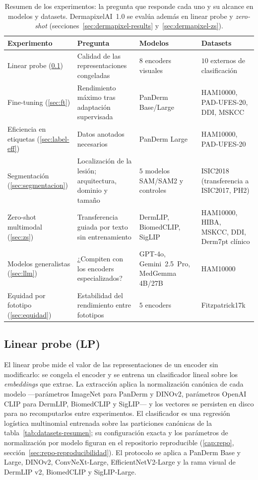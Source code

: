 \begin{table}[htbp]
\centering
\footnotesize
\setlength{\tabcolsep}{4pt}
\renewcommand{\arraystretch}{1.15}
\caption{Resumen de los experimentos: la pregunta que responde cada
uno y su alcance en modelos y datasets. DermapixelAI~1.0 se evalúa
además en linear probe y \emph{zero-shot}
(secciones~\ref{sec:dermapixel-results} y~\ref{sec:dermapixel-zs}).}
\label{tab:experimentos}
\begin{tabular}{p{2.5cm}p{3.7cm}p{2.9cm}p{3.4cm}}
\hline
Experimento & Pregunta & Modelos & Datasets \\
\hline
Linear probe (\ref{sec:lp})
  & Calidad de las representaciones congeladas
  & $8$ encoders visuales
  & $10$ externos de clasificación \\
Fine-tuning (\ref{sec:ft})
  & Rendimiento máximo tras adaptación supervisada
  & PanDerm Base/Large
  & HAM10000, PAD-UFES-20, DDI, MSKCC \\
Eficiencia en etiquetas (\ref{sec:label-eff})
  & Datos anotados necesarios
  & PanDerm Large
  & HAM10000, PAD-UFES-20 \\
Segmentación (\ref{sec:segmentacion})
  & Localización de la lesión; arquitectura, dominio y tamaño
  & $5$ modelos SAM/SAM2 y controles
  & ISIC2018 (transferencia a ISIC2017, PH2) \\
Zero-shot multimodal (\ref{sec:zs})
  & Transferencia guiada por texto sin entrenamiento
  & DermLIP, BiomedCLIP, SigLIP
  & HAM10000, HIBA, MSKCC, DDI, Derm7pt clínico \\
Modelos generalistas (\ref{sec:llm})
  & ¿Compiten con los encoders especializados?
  & GPT-4o, Gemini~2.5~Pro, MedGemma 4B/27B
  & HAM10000 \\
Equidad por fototipo (\ref{sec:equidad})
  & Estabilidad del rendimiento entre fototipos
  & $5$ encoders
  & Fitzpatrick17k \\
\hline
\end{tabular}
\end{table}

\subsection{Linear probe (LP)}
\label{sec:lp}

El linear probe mide el valor de las representaciones de un encoder
sin modificarlo: se congela el encoder y se entrena un clasificador
lineal sobre los \emph{embeddings} que extrae. La extracción aplica
la normalización canónica de cada modelo —parámetros ImageNet para
PanDerm y DINOv2, parámetros OpenAI CLIP para DermLIP, BiomedCLIP y
SigLIP— y los vectores se persisten en disco para no recomputarlos
entre experimentos. El clasificador es una regresión logística
multinomial entrenada sobre las particiones canónicas de la
tabla~\ref{tab:datasets-resumen}; su configuración exacta y los
parámetros de normalización por modelo figuran en el repositorio
reproducible (\ref{cap:repo}, sección~\ref{sec:repo-reproducibilidad}).
El protocolo se aplica a PanDerm Base y Large, DINOv2,
ConvNeXt-Large, EfficientNetV2-Large y la rama visual de DermLIP v2,
BiomedCLIP y SigLIP-Large.

